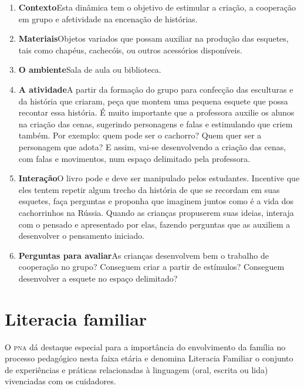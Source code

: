 \documentclass[11pt]{extarticle}
\begin{document}
\begin{enumerate}
\item \textbf{Contexto}\quad Esta dinâmica tem o objetivo de estimular a criação, a cooperação em grupo e afetividade na encenação de histórias.

\item \textbf{Materiais}\quad Objetos variados que possam auxiliar na produção das esquetes, tais como chapéus, cachecóis, ou outros acessórios disponíveis. 

\item \textbf{O ambiente}\quad Sala de aula ou biblioteca. 

\item \textbf{A atividade}\quad A partir da formação do grupo para confecção das esculturas e da história que criaram, peça que montem uma pequena esquete que possa recontar essa história. É muito importante que a professora auxilie os alunos na criação das cenas, sugerindo personagens e falas e estimulando que criem também. Por exemplo: quem pode ser o cachorro? Quem quer ser a personagem que adota? E assim, vai-se desenvolvendo a criação das cenas, com falas e movimentos, num espaço delimitado pela professora.


\item \textbf{Interação}\quad O livro pode e deve ser 
manipulado pelos estudantes. Incentive que eles tentem repetir algum trecho da história de que se recordam em suas esquetes,
faça perguntas e proponha que imaginem juntos como é a vida 
dos cachorrinhos na Rússia. Quando as crianças propuserem suas ideias, interaja com o pensado e apresentado por elas, fazendo perguntas que as auxiliem a desenvolver o pensamento iniciado.

\item \textbf{Perguntas para avaliar}\quad As crianças desenvolvem bem o trabalho de cooperação no grupo? Conseguem criar a partir de estímulos? Conseguem desenvolver a esquete no espaço delimitado?
\end{enumerate}


\section{Literacia familiar}
O \textsc{pna} dá destaque especial para a importância do envolvimento da família 
no processo pedagógico nesta faixa etária e denomina Literacia Familiar o conjunto 
de experiências e práticas relacionadas à linguagem (oral, escrita ou lida) vivenciadas 
com os cuidadores. 
\end{document}

